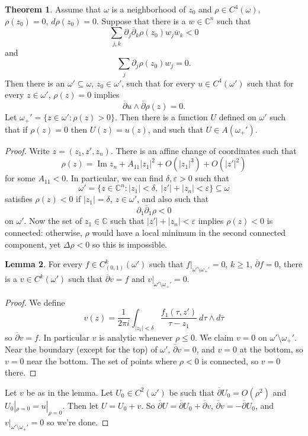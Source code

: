 \documentclass[12pt]{report}
\newcommand{\CC}{\mathbb{C}}
\newcommand{\dbar}{\overline\partial}
\renewcommand{\Im}{\operatorname{Im}}
\theoremstyle{definition}
\newtheorem{theorem}{Theorem}[chapter]
\newtheorem{lemma}[theorem]{Lemma}
\begin{document}
\begin{theorem}
    Assume that $\omega$ is a neighborhood of $z_0$ and $\rho \in C^4(\omega)$, $\rho(z_0) = 0$, $d\rho(z_0) = 0$. Suppose that there is a $w \in \CC^n$ such that
    $$\sum_{j,k} \partial_j \dbar_k \rho(z_0) w_j \overline w_k < 0$$
    and
    $$\sum_j \partial_j \rho(z_0) w_j = 0.$$
    Then there is an $\omega' \subseteq \omega$, $z_0 \in \omega'$, such that for every $u \in C^4(\omega')$ such that for every $z \in \omega'$, $\rho(z) = 0$ implies
    $$\dbar u \wedge \dbar \rho(z) = 0.$$
    Let $\omega_+' = \{z \in \omega': \rho(z) > 0\}$. Then there is a function $U$ defined on $\omega'$ such that if $\rho(z) = 0$ then $U(z) = u(z)$, and such that $U \in A(\omega_+')$.
\end{theorem}
\begin{proof}
    Write $z = (z_1, z', z_n)$. There is an affine change of coordinates such that
    $$\rho(z) = \Im z_n + A_{11}|z_1|^2 + O(|z_1|^3) + O(|z'|^2)$$
    for some $A_{11} < 0$. In particular, we can find $\delta, \varepsilon > 0$ such that
    $$\omega' = \{z \in \CC^n: |z_1| < \delta, ~|z'| + |z_n| < \varepsilon\} \subseteq \omega$$
    satisfies $\rho(z) < 0$ if $|z_1| = \delta$, $z \in \omega'$, and also such that
    $$\partial_1 \dbar_1 \rho < 0$$
    on $\omega'$. Now the set of $z_1 \in \CC$ such that $|z'| + |z_n| < \varepsilon$ implies $\rho(z) < 0$ is connected: otherwise, $\rho$ would have a local minimum in the second connected component, yet $\Delta \rho < 0$ so this is impossible.
\begin{lemma}
    For every $f \in C^k_{(0, 1)}(\omega')$ such that $f|_{\omega' \setminus \omega_+'} = 0$, $k \geq 1$, $\dbar f = 0$, there is a $v \in C^k(\omega')$ such that $\dbar v = f$ and $v|_{\omega' \setminus \omega_+'} = 0$.
\end{lemma}
\begin{proof}
    We define
    $$v(z) = \frac{1}{2\pi i} \int_{|z_1| < \delta} \frac{f_1(\tau, z')}{\tau - z_1} ~d\tau \wedge d\overline \tau$$
    so $\dbar v = f$. In particular $v$ is analytic whenever $\rho \leq 0$. We claim $v = 0$ on $\omega' \setminus \omega_+'$. Near the boundary (except for the top) of $\omega'$, $\dbar v = 0$, and $v = 0$ at the bottom, so $v = 0$ near the bottom. The set of points where $\rho < 0$ is connected, so $v = 0$ there.
\end{proof}
    Let $v$ be as in the lemma. Let $U_0 \in C^2(\omega')$ be such that $\dbar U_0 = O(\rho^2)$ and $U_0|_{\rho=0} = u|_{\rho = 0}$. Then let $U = U_0 + v$. So $\dbar U = \dbar U_0 + \dbar v$, $\dbar v = - \dbar U_0$, and $v|_{\omega' \setminus \omega_+'} = 0$ so we're done.
\end{proof}
\end{document}
